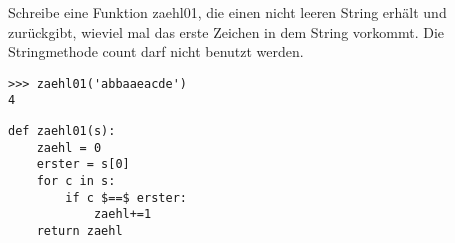 \question[3] Schreibe eine Funktion zaehl01, die einen nicht leeren String erhält und zurückgibt,
wieviel mal das erste Zeichen in dem String vorkommt. Die Stringmethode count darf nicht benutzt werden.
\begin{lstlisting}
>>> zaehl01('abbaaeacde')
4
\end{lstlisting}
\begin{solutionbox}{4cm}
\begin{lstlisting}
def zaehl01(s):
    zaehl = 0
    erster = s[0]
    for c in s:
        if c $==$ erster:
            zaehl+=1
    return zaehl

\end{lstlisting}
\end{solutionbox}

